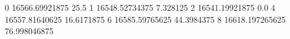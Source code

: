 0 16566.69921875 25.5
1 16548.52734375 7.328125
2 16541.19921875 0.0
4 16557.81640625 16.6171875
6 16585.59765625 44.3984375
8 16618.197265625 76.998046875
